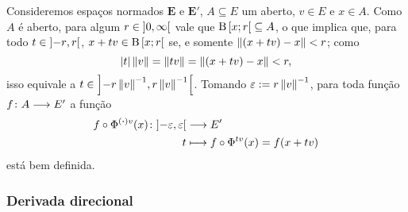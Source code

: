 Consideremos espaços normados $\bm E$ e $\bm E'$, $A \subseteq E$ um aberto, $v \in E$ e $x \in A$. Como $A$ é aberto, para algum $r \in \left]{0},{\infty}\right[$ vale que $\mathrm{B}\left[{x};{r}\right[ \subseteq A$, o que implica que, para todo $t \in \left]{-r},{r}\right[$, $x + tv \in \mathrm{B}\left[{x};{r}\right[$ se, e somente $\left\Vert{(x+tv)-x}\right\Vert<r$; como
	\begin{equation*}
	\left\vert{t}\right\vert\left\Vert{v}\right\Vert = \left\Vert{tv}\right\Vert = \left\Vert{(x+tv)-x}\right\Vert<r,
	\end{equation*}
isso equivale a $t \in \left]{-r \left\Vert{v}\right\Vert^{-1}},{r \left\Vert{v}\right\Vert^{-1}}\right[$. Tomando $\varepsilon := r \left\Vert{v}\right\Vert^{-1}$, para toda função ${f}\colon {A} \longrightarrow {E'}$ a função
	\begin{align*}
	{f \circ {\Phi}^{{(\bm{\cdot})}{v}}(x)}\colon {\left]{-\varepsilon},{\varepsilon}\right[} &\longrightarrow {E'} \\{t} &\longmapsto f \circ {\Phi}^{{t}{v}}(x) = f(x+tv)
	\end{align*}
está bem definida.


\subsubsection{Derivada direcional}

\begin{comment}

\begin{definition}
Sejam $(\bm E,\nor{\var})$ um espaço normado, $A \subseteq E$ um aberto, $v \in E$ e $x \in A$. Uma função de $A$ para $\R$ \emph{derivável em $x$ na direção $v$} é uma função $\fun{f}{A}{\R}$ tal que existe o limite
	\begin{equation*}
	\lim_{t \to 0} \frac{f(x+tv)-f(x)}{t}.
	\end{equation*}
Nesse caso, a \emph{derivada direcional de $f$ em $x$ na direção $v$} é
	\begin{equation*}
	\dir{v} f(x) := \lim_{t \to 0} \frac{f(x+tv)-f(x)}{t}.
	\end{equation*}
\end{definition}

\end{comment}

